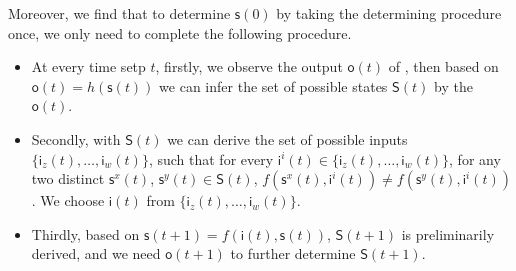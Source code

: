 


 Moreover, we find that to determine $\mathsf{s}(0)$ by taking the determining procedure once, we only need to complete the following procedure.

\begin{itemize}
\item At every time setp $t$, firstly, we observe the output $\mathsf{o}(t)$ of \BCN, then based on $\mathsf{o}(t)=h(\mathsf{s}(t))$ we can infer the set of possible states $\mathsf{S}(t)$ by the $\mathsf{o}(t)$.
\item Secondly, with $\mathsf{S}(t)$ we can derive the set of possible inputs $\{\mathsf{i}_z(t),\ldots,\mathsf{i}_w(t)\}$, such that for every $\mathsf{i}^{i}(t)\in \{\mathsf{i}_z(t),\ldots,\mathsf{i}_w(t)\}$, for any two distinct $\mathsf{s}^{x}(t)$, $\mathsf{s}^{y}(t) \in \mathsf{S}(t)$, $f(\mathsf{s}^{x}(t), \mathsf{i}^{i}(t))\neq f(\mathsf{s}^{y}(t),\mathsf{i}^{i}(t))$. We choose $\mathsf{i}(t)$ from $\{\mathsf{i}_z(t),\ldots,\mathsf{i}_w(t)\}$.
\item Thirdly, based on $\mathsf{s}(t+1)= f({\mathsf{i}(t)},{\mathsf{s}(t)})$, $\mathsf{S}(t+1)$ is preliminarily derived, and we need $\mathsf{o}(t+1)$ to further determine $\mathsf{S}(t+1)$. 
\end{itemize} 

